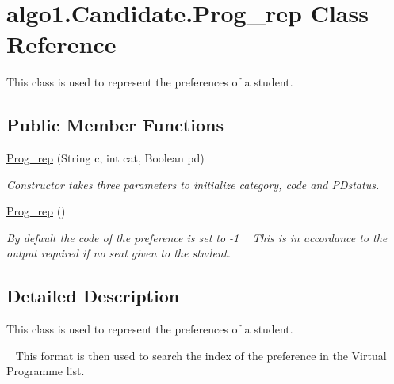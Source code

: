 \hypertarget{classalgo1_1_1Candidate_1_1Prog__rep}{\section{algo1.\+Candidate.\+Prog\+\_\+rep Class Reference}
\label{classalgo1_1_1Candidate_1_1Prog__rep}
}


This class is used to represent the preferences of a student.  


\subsection*{Public Member Functions}
\begin{DoxyCompactItemize}
\item 
\hyperlink{classalgo1_1_1Candidate_1_1Prog__rep_aea4b8cb97895beebaeb464d03556dbb8}{Prog\+\_\+rep} (String c, int cat, Boolean pd)
\begin{DoxyCompactList}\small\item\em Constructor takes three parameters to initialize category, code and P\+Dstatus. \end{DoxyCompactList}\item 
\hypertarget{classalgo1_1_1Candidate_1_1Prog__rep_ade087ff176abe4ae13ff36e4c7c976e6}{\hyperlink{classalgo1_1_1Candidate_1_1Prog__rep_ade087ff176abe4ae13ff36e4c7c976e6}{Prog\+\_\+rep} ()}\label{classalgo1_1_1Candidate_1_1Prog__rep_ade087ff176abe4ae13ff36e4c7c976e6}

\begin{DoxyCompactList}\small\item\em By default the code of the preference is set to -\/1 ~\newline
 This is in accordance to the output required if no seat given to the student. \end{DoxyCompactList}\end{DoxyCompactItemize}


\subsection{Detailed Description}
This class is used to represent the preferences of a student. 

~\newline
 This format is then used to search the index of the preference in the Virtual Programme list. ~\newline
 

